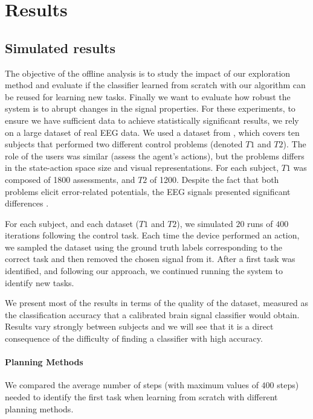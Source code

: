 \section{Results}

\subsection{Simulated results}

The objective of the offline analysis is to study the impact of our exploration method and evaluate if the classifier learned from scratch with our algorithm can be reused for learning new tasks. Finally we want to evaluate how robust the system is to abrupt changes in the signal properties. For these experiments, to ensure we have sufficient data to achieve statistically significant results, we rely on a large dataset of real EEG data. We used a dataset from \cite{iturrate2013task}, which covers ten subjects that performed two different control problems (denoted $T1$ and $T2$). The role of the users was similar (assess the agent's actions), but the problems differs in the state-action space size and visual representations. For each subject, $T1$ was composed of 1800 assessments, and $T2$ of 1200. Despite the fact that both problems elicit error-related potentials, the EEG signals presented significant differences \cite{iturrate2013task}.

For each subject, and each dataset ($T1$ and $T2$), we simulated $20$ runs of $400$ iterations following the control task. Each time the device performed an action, we sampled the dataset using the ground truth labels corresponding to the correct task and then removed the chosen signal from it. After a first task was identified, and following our approach, we continued running the system to identify new tasks. 

We present most of the results in terms of the quality of the dataset, measured as the classification accuracy that a calibrated brain signal classifier would obtain. Results vary strongly between subjects and we will see that it is a direct consequence of the difficulty of finding a classifier with high accuracy. 

\paragraph{Planning Methods}
We compared the average number of steps (with maximum values of $400$ steps) needed to identify the first task when learning from scratch with different planning methods.

